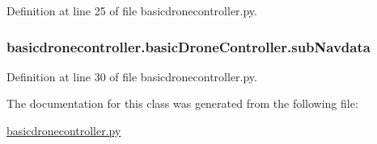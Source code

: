 Definition at line 25 of file basicdronecontroller.\-py.

\hypertarget{classbasicdronecontroller_1_1basicDroneController_a182cc9c8459937f8db8ff30f666234b9}{
\subsubsection[{sub\-Navdata}]{\setlength{\rightskip}{0pt plus 5cm}basicdronecontroller.\-basic\-Drone\-Controller.\-sub\-Navdata}}\label{classbasicdronecontroller_1_1basicDroneController_a182cc9c8459937f8db8ff30f666234b9}


Definition at line 30 of file basicdronecontroller.\-py.



The documentation for this class was generated from the following file\-:\begin{DoxyCompactItemize}
\item 
\hyperlink{basicdronecontroller_8py}{basicdronecontroller.\-py}\end{DoxyCompactItemize}
